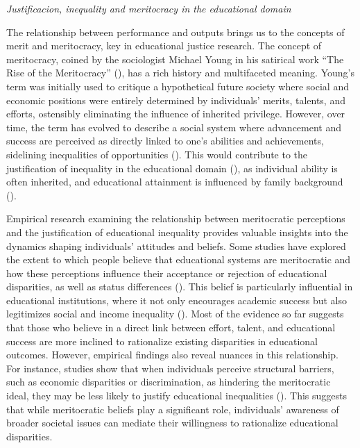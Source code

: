 \documentclass[
  12pt,
  a4paper,
]{article}
\begin{document}
\emph{Justificacion, inequality and meritocracy in the educational domain}

The relationship between performance and outputs brings us to the concepts of merit and meritocracy, key in educational justice research. The concept of meritocracy, coined by the sociologist Michael Young in his satirical work ``The Rise of the Meritocracy'' (), has a rich history and multifaceted meaning. Young's term was initially used to critique a hypothetical future society where social and economic positions were entirely determined by individuals' merits, talents, and efforts, ostensibly eliminating the influence of inherited privilege. However, over time, the term has evolved to describe a social system where advancement and success are perceived as directly linked to one's abilities and achievements, sidelining inequalities of opportunities (). This would contribute to the justification of inequality in the educational domain (), as individual ability is often inherited, and educational attainment is influenced by family background ().

Empirical research examining the relationship between meritocratic perceptions and the justification of educational inequality provides valuable insights into the dynamics shaping individuals' attitudes and beliefs. Some studies have explored the extent to which people believe that educational systems are meritocratic and how these perceptions influence their acceptance or rejection of educational disparities, as well as status differences (). This belief is particularly influential in educational institutions, where it not only encourages academic success but also legitimizes social and income inequality (). Most of the evidence so far suggests that those who believe in a direct link between effort, talent, and educational success are more inclined to rationalize existing disparities in educational outcomes. However, empirical findings also reveal nuances in this relationship. For instance, studies show that when individuals perceive structural barriers, such as economic disparities or discrimination, as hindering the meritocratic ideal, they may be less likely to justify educational inequalities (). This suggests that while meritocratic beliefs play a significant role, individuals' awareness of broader societal issues can mediate their willingness to rationalize educational disparities.
\end{document}

